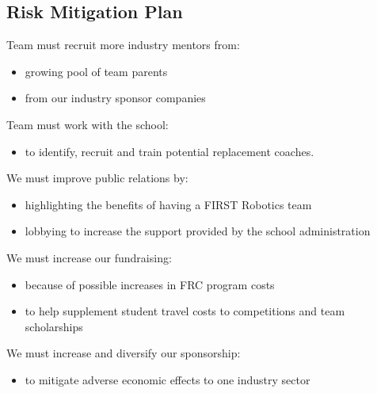 \subsection{Risk Mitigation Plan}
Team must recruit more industry mentors from:
\begin{itemize}
	\item growing pool of team parents
	\item from our industry sponsor companies
\end{itemize}

Team must work with the school:
\begin{itemize}
	\item to identify, recruit and train potential replacement coaches.
\end{itemize}

We must improve public relations by:
\begin{itemize}
	\item highlighting the benefits of having a FIRST Robotics team
	\item lobbying to increase the support provided by the school administration
\end{itemize}

We must increase our fundraising:
\begin{itemize}
	\item because of possible increases in FRC program costs
	\item to help supplement student travel costs to competitions and team scholarships
\end{itemize}

We must increase and diversify our sponsorship:
\begin{itemize}
	\item to mitigate adverse economic effects to one industry sector 
\end{itemize}

\newpage

